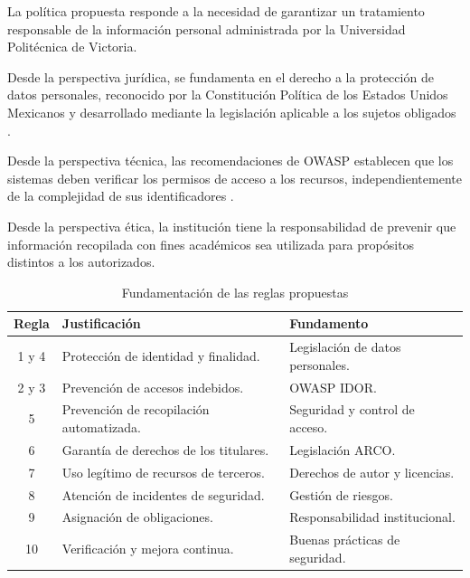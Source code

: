 \documentclass[12pt]{article}
\begin{document}
La política propuesta responde a la
necesidad de garantizar un tratamiento
responsable de la información personal
administrada por la Universidad
Politécnica de Victoria.

Desde la perspectiva jurídica,
se fundamenta en el derecho
a la protección de datos personales,
reconocido por la Constitución
Política de los Estados Unidos
Mexicanos y desarrollado mediante
la legislación aplicable a
los sujetos obligados
\parencite{lgpdppso2025}.

Desde la perspectiva técnica,
las recomendaciones de OWASP
establecen que los sistemas
deben verificar los permisos
de acceso a los recursos,
independientemente de la
complejidad de sus identificadores
\parencite{owaspidor}.

Desde la perspectiva ética,
la institución tiene la
responsabilidad de prevenir
que información recopilada
con fines académicos sea
utilizada para propósitos
distintos a los autorizados.

\begin{table}[H]
\centering
\caption{Fundamentación de las reglas propuestas}
\label{tab:fundamentacion}
\small
\begin{tabularx}{\textwidth}{|c|X|X|}
\hline
\textbf{Regla} &
\textbf{Justificación} &
\textbf{Fundamento} \\ \hline

1 y 4 &
Protección de identidad y finalidad. &
Legislación de datos personales. \\ \hline

2 y 3 &
Prevención de accesos indebidos. &
OWASP IDOR. \\ \hline

5 &
Prevención de recopilación automatizada. &
Seguridad y control de acceso. \\ \hline

6 &
Garantía de derechos de los titulares. &
Legislación ARCO. \\ \hline

7 &
Uso legítimo de recursos de terceros. &
Derechos de autor y licencias. \\ \hline

8 &
Atención de incidentes de seguridad. &
Gestión de riesgos. \\ \hline

9 &
Asignación de obligaciones. &
Responsabilidad institucional. \\ \hline

10 &
Verificación y mejora continua. &
Buenas prácticas de seguridad. \\ \hline

\end{tabularx}
\end{table}
\end{document}
